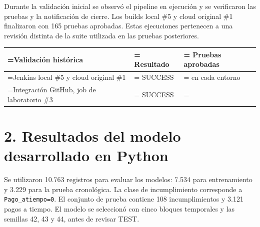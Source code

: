 Durante la validación inicial se observó el pipeline en ejecución y se verificaron las pruebas y la notificación de cierre. Los builds local \#5 y cloud original \#1 finalizaron con 165 pruebas aprobadas. Estas ejecuciones pertenecen a una revisión distinta de la suite utilizada en las pruebas posteriores.

\par\medskip\begin{fullwidth}\noindent
\begin{minipage}{\linewidth}\small
\setlength{\tabcolsep}{5pt}\renewcommand{\arraystretch}{1.24}
\begin{tabularx}{\linewidth}{@{}>{\hsize=1.46154\hsize\linewidth=\hsize\RaggedRight\arraybackslash}X>{\hsize=0.76923\hsize\linewidth=\hsize\RaggedRight\arraybackslash}X>{\hsize=0.76923\hsize\linewidth=\hsize\RaggedRight\arraybackslash}X@{}}
\toprule
\textbf{Validación histórica} & \textbf{Resultado} & \textbf{Pruebas aprobadas} \\
\midrule
Jenkins local \#5 y cloud original \#1 & SUCCESS & 165 en cada entorno \\
Integración GitHub, job de laboratorio \#3 & SUCCESS & 186 \\
\bottomrule
\end{tabularx}
\end{minipage}
\end{fullwidth}\par\medskip







\FloatBarrier


\section{2. Resultados del modelo desarrollado en Python}

Se utilizaron 10.763 registros para evaluar los modelos: 7.534 para entrenamiento y 3.229 para la prueba cronológica. La clase de incumplimiento corresponde a \nolinkurl{Pago_atiempo=0}. El conjunto de prueba contiene 108 incumplimientos y 3.121 pagos a tiempo. El modelo se seleccionó con cinco bloques temporales y las semillas 42, 43 y 44, antes de revisar TEST.


